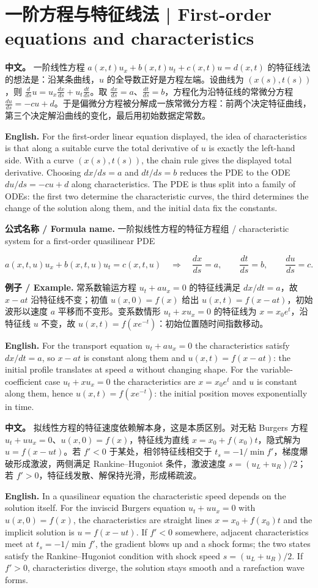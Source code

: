 \documentclass[UTF8,11pt,a4paper]{ctexart}
\newcommand{\EN}[1]{\par\noindent \textbf{English.} #1\par}
\newcommand{\FORMULA}[2]{\par\noindent\textbf{公式名称 / Formula name.} #1 / #2\par}
\newcommand{\EX}[2]{\par\noindent \textbf{例子 / Example.} #1\par\EN{#2}}
\newcommand{\APS}[2]{\par\noindent\textbf{中文。} #1\par\noindent\textbf{English.} #2\par\smallskip}
\begin{document}
\section[一阶方程与特征线]{一阶方程与特征线法 | First-order equations and characteristics}
\APS{一阶线性方程 $a(x,t)u_x+b(x,t)u_t+c(x,t)u=d(x,t)$ 的特征线法的想法是：沿某条曲线，$u$ 的全导数正好是方程左端。设曲线为 $(x(s),t(s))$，则 $\frac{d}{ds}u=u_x\frac{dx}{ds}+u_t\frac{dt}{ds}$。取 $\frac{dx}{ds}=a$、$\frac{dt}{ds}=b$，方程化为沿特征线的常微分方程 $\frac{du}{ds}=-cu+d$。于是偏微分方程被分解成一族常微分方程：前两个决定特征曲线，第三个决定解沿曲线的变化，最后用初始数据定常数。}{For the first-order linear equation displayed, the idea of characteristics is that along a suitable curve the total derivative of $u$ is exactly the left-hand side. With a curve $(x(s),t(s))$, the chain rule gives the displayed total derivative. Choosing $dx/ds=a$ and $dt/ds=b$ reduces the PDE to the ODE $du/ds=-cu+d$ along characteristics. The PDE is thus split into a family of ODEs: the first two determine the characteristic curves, the third determines the change of the solution along them, and the initial data fix the constants.}
\FORMULA{一阶拟线性方程的特征方程组}{characteristic system for a first-order quasilinear PDE}
\[
a(x,t,u)u_x+b(x,t,u)u_t=c(x,t,u)\quad\Longrightarrow\quad
\frac{dx}{ds}=a,\qquad \frac{dt}{ds}=b,\qquad \frac{du}{ds}=c .
\]
\EX{常系数输运方程 $u_t+au_x=0$ 的特征线满足 $dx/dt=a$，故 $x-at$ 沿特征线不变；初值 $u(x,0)=f(x)$ 给出 $u(x,t)=f(x-at)$，初始波形以速度 $a$ 平移而不变形。变系数情形 $u_t+xu_x=0$ 的特征线为 $x=x_0e^t$，沿特征线 $u$ 不变，故 $u(x,t)=f(xe^{-t})$：初始位置随时间指数移动。}{For the transport equation $u_t+au_x=0$ the characteristics satisfy $dx/dt=a$, so $x-at$ is constant along them and $u(x,t)=f(x-at)$: the initial profile translates at speed $a$ without changing shape. For the variable-coefficient case $u_t+xu_x=0$ the characteristics are $x=x_0e^t$ and $u$ is constant along them, hence $u(x,t)=f(xe^{-t})$: the initial position moves exponentially in time.}
\APS{拟线性方程的特征速度依赖解本身，这是本质区别。对无粘 Burgers 方程 $u_t+uu_x=0$、$u(x,0)=f(x)$，特征线为直线 $x=x_0+f(x_0)t$，隐式解为 $u=f(x-ut)$。若 $f'<0$ 于某处，相邻特征线相交于 $t_s=-1/\min f'$，梯度爆破形成激波，两侧满足 Rankine--Hugoniot 条件，激波速度 $s=(u_L+u_R)/2$；若 $f'>0$，特征线发散、解保持光滑，形成稀疏波。}{In a quasilinear equation the characteristic speed depends on the solution itself. For the inviscid Burgers equation $u_t+uu_x=0$ with $u(x,0)=f(x)$, the characteristics are straight lines $x=x_0+f(x_0)t$ and the implicit solution is $u=f(x-ut)$. If $f'<0$ somewhere, adjacent characteristics meet at $t_s=-1/\min f'$, the gradient blows up and a shock forms; the two states satisfy the Rankine--Hugoniot condition with shock speed $s=(u_L+u_R)/2$. If $f'>0$, characteristics diverge, the solution stays smooth and a rarefaction wave forms.}
\end{document}
